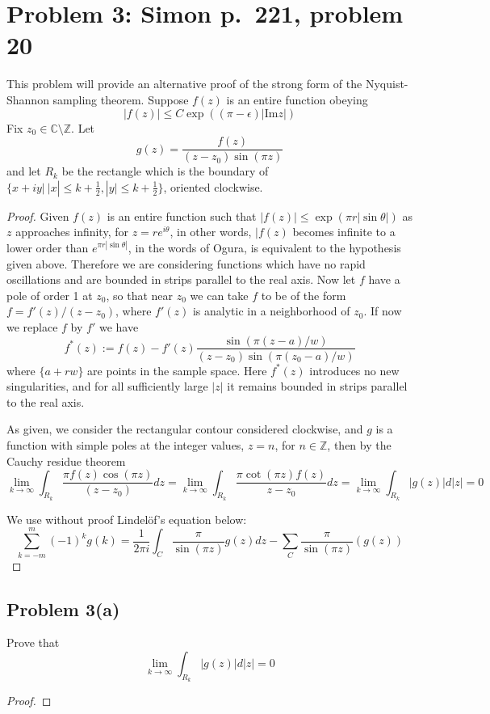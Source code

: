 \documentclass{article}[12pt]
\def\CC{{\mathbb C}}
\def\ZZ{{\mathbb Z}}
\begin{document}
\section*{Problem 3: Simon p.~221, problem 20}
 This problem will provide an alternative
proof of the strong form of the Nyquist-Shannon sampling theorem.
Suppose $f(z)$ is an entire function obeying
\[
|f(z)| \le C \exp((\pi-\epsilon)|\mbox{Im}z|)
\]
Fix $z_0\in \CC\setminus \ZZ$. Let
\[
g(z)=\frac{f(z)}{(z-z_0)\sin(\pi z)}
\]
and let $R_k$ be the rectangle which is the boundary 
of $\{x+iy|\ |x|\le k+\frac{1}{2}, |y|\le k+\frac{1}{2}\}$, oriented
clockwise.
\begin{proof}
  Given $f(z)$ is an entire function such that $|f(z)|\le \exp(\pi r |\sin \theta|)$
  as $z$ approaches infinity, for $z=re^{i\theta}$, in other words,
  $|f(z)$ becomes infinite to a lower order than $e^{\pi r|\sin\theta|}$, in the
  words of Ogura, is equivalent to the hypothesis given above.
  Therefore we are considering functions which have no rapid oscillations and
  are bounded in strips parallel to the real axis.
  Now let $f$ have a pole of order 1 at $z_0$, so that near $z_0$ we can take
  $f$ to be of the form $f=f'(z)/(z-z_0)$, where $f'(z)$ is analytic in a
  neighborhood of $z_0$. If now we replace $f$ by $f'$ we have
  \[
  f^*(z) := f(z)-f'(z)\frac{\sin(\pi(z-a)/w)}{(z-z_0)\sin(\pi(z_0-a)/w)}
  \]
  where $\{a+rw\}$ are points in the sample space.
  Here $f^*(z)$ introduces no new singularities, and for all sufficiently
  large $|z|$ it remains bounded in strips parallel to the real axis.

  As given, we consider the rectangular contour considered clockwise,
  and $g$ is a function with simple poles at the integer values, $z=n$,
  for $n\in\ZZ$, then by the Cauchy residue theorem
  \[
  \lim_{k\to\infty} \int_{R_k} \frac{\pi f(z) \cos(\pi z)}{(z-z_0)} dz =
  \lim_{k\to\infty} \int_{R_k} \frac{\pi \cot(\pi z) f(z)}{z-z_0} dz =
  \lim_{k\to\infty} \int_{R_k} |g(z)| d|z| = 0
  \]
  
  We use without proof Lindel\"of's equation below:
  \[
  \sum_{k=-m}^m (-1)^k g(k) = \frac{1}{2\pi i}\int_C \frac{\pi}{\sin(\pi z)} g(z)dz
  - \sum_C \frac{\pi}{\sin(\pi z)}(g(z))
  \]
  
\end{proof}

\subsection*{Problem 3(a)}Prove that
\[
\lim_{k\to\infty} \int_{R_k}|g(z)|d|z|=0
\]
\begin{proof}

\end{proof}
\end{document}

